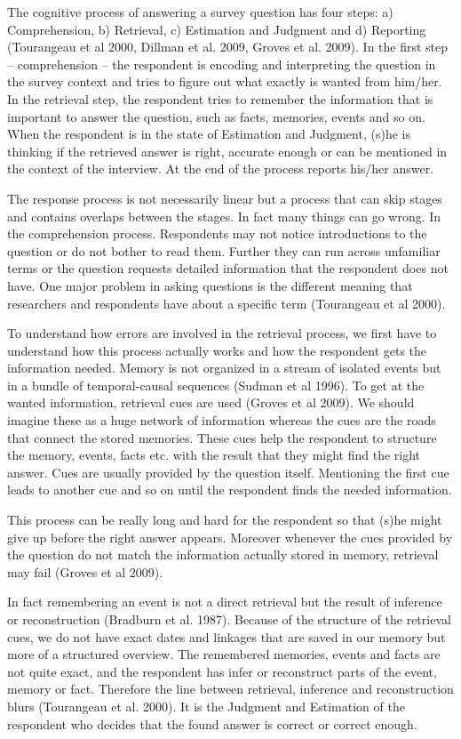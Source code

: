 The cognitive process of answering a survey question has four steps: a) Comprehension, b) Retrieval, c) Estimation and Judgment and d) Reporting (Tourangeau et al 2000, Dillman et al. 2009, Groves et al. 2009). In the first step -- comprehension -- the respondent is encoding and interpreting the question in the survey context and tries to figure out what exactly is wanted from him/her. In the retrieval step, the respondent tries to remember the information that is important to answer the question, such as facts, memories, events and so on. When the respondent is in the state of Estimation and Judgment, (s)he is thinking if the retrieved answer is right, accurate enough or can be mentioned in the context of the interview. At the end of the process reports his/her answer. 

The response process is not necessarily linear but a process that can skip stages and contains overlaps between the stages. In fact many things can go wrong. In the comprehension process. Respondents may not notice introductions to the question or do not bother to read them. Further they can run across unfamiliar terms or the question requests detailed information that the respondent does not have. One major problem in asking questions is the different meaning that researchers and respondents have about a specific term (Tourangeau et al 2000). 

To understand how errors are involved in the retrieval process, we first have to understand how this process actually works and how the respondent gets the information needed. Memory is not organized in a stream of isolated events but in a bundle of temporal-causal sequences (Sudman et al 1996). To get at the wanted information, retrieval cues are used (Groves et al 2009). We should imagine these as a huge network of information whereas the cues are the roads that connect the stored memories. These cues help the respondent to structure the memory, events, facts etc. with the result that they might find the right answer. Cues are usually provided by the question itself. Mentioning the first cue leads to another cue and so on until the respondent finds the needed information.

This process can be really long and hard for the respondent so that (s)he might give up before the right answer appears. Moreover whenever the cues provided by the question do not match the information actually stored in memory, retrieval may fail (Groves et al 2009). 

In fact remembering an event is not a direct retrieval but the result of inference or reconstruction (Bradburn et al. 1987). Because of the structure of the retrieval cues, we do not have exact dates and linkages that are saved in our memory but more of a structured overview. The remembered memories, events and facts are not quite exact, and the respondent has infer or reconstruct parts of the event, memory or fact. Therefore the line between retrieval, inference and reconstruction blurs (Tourangeau et al. 2000). It is the Judgment and Estimation of the respondent who decides that the found answer is correct or correct enough.

